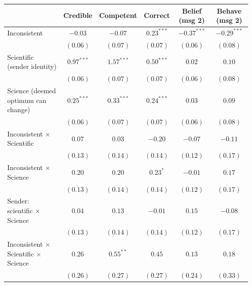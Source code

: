 
\begin{table}
\begin{center}
\begin{tabular}{l c c c c c}
\hline
 & Credible & Competent & Correct & Belief (msg 2) & Behave (msg 2) \\
\hline
Inconsistent                                      & $-0.03$      & $-0.07$      & $0.23^{***}$ & $-0.37^{***}$ & $-0.29^{***}$ \\
                                                  & $(0.06)$     & $(0.07)$     & $(0.07)$     & $(0.06)$      & $(0.08)$      \\
Scientific (sender identity)                      & $0.97^{***}$ & $1.57^{***}$ & $0.50^{***}$ & $0.02$        & $0.10$        \\
                                                  & $(0.06)$     & $(0.07)$     & $(0.07)$     & $(0.06)$      & $(0.08)$      \\
Science (deemed optimum can change)               & $0.25^{***}$ & $0.33^{***}$ & $0.24^{***}$ & $0.03$        & $0.09$        \\
                                                  & $(0.06)$     & $(0.07)$     & $(0.07)$     & $(0.06)$      & $(0.08)$      \\
Inconsistent $\times$ Scientific                  & $0.07$       & $0.03$       & $-0.20$      & $-0.07$       & $-0.11$       \\
                                                  & $(0.13)$     & $(0.14)$     & $(0.14)$     & $(0.12)$      & $(0.17)$      \\
Inconsistent $\times$ Science                     & $0.20$       & $0.20$       & $0.23^{*}$   & $-0.01$       & $0.17$        \\
                                                  & $(0.13)$     & $(0.14)$     & $(0.14)$     & $(0.12)$      & $(0.17)$      \\
Sender: scientific $\times$ Science               & $0.04$       & $0.13$       & $-0.01$      & $0.15$        & $-0.08$       \\
                                                  & $(0.13)$     & $(0.14)$     & $(0.14)$     & $(0.12)$      & $(0.17)$      \\
Inconsistent $\times$ Scientific $\times$ Science & $0.26$       & $0.55^{**}$  & $0.45$       & $0.13$        & $0.18$        \\
                                                  & $(0.26)$     & $(0.27)$     & $(0.27)$     & $(0.24)$      & $(0.33)$      \\

\end{tabular}
\end{center}
\end{table}

